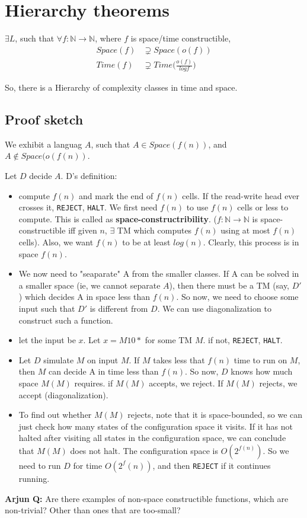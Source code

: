 \section{Hierarchy theorems}
$\exists L$, such that $\forall f: \mathbb{N} \to \mathbb{N}$, where $f$ is
space/time constructible,
\begin{align*}
    Space(f) &\supsetneq Space(o(f)) \\
    Time(f) &\supsetneq Time \bigg (\frac{o(f)}{log f} \bigg )
\end{align*}

So, there is a Hierarchy of complexity classes in time and space.

\subsection{Proof sketch}
We exhibit a languag $A$, such that $A \in Space(f(n))$, and $A \notin Space(o(f(n))$.

Let $D$ decide $A$. D's definition:
\begin{itemize}
    \item compute $f(n)$ and mark the end of $f(n)$ cells. If the read-write head
        ever crosses it, \texttt{REJECT}, \texttt{HALT}. We first need
        $f(n)$ to use $f(n)$ cells or less to compute. This is called as 
        \textbf{space-constructribility}. ($f: \mathbb{N} \to \mathbb{N}$ is
        space-constructible iff given $n$, $\exists$ TM which computes $f(n)$ 
        using at most $f(n)$ cells). Also, we want $f(n)$ to be at least
        $log(n)$. Clearly, this process is in space $f(n)$.

    \item We now need to "seaparate" A from the smaller classes. If A can be
        solved in a smaller space (ie, we cannot separate $A$), then
        there must be a TM (say, $D'$) which decides A in space less than $f(n)$.
        So now, we need to choose some input such that $D'$ is different from $D$.
        We can use diagonalization to construct such a function.

    \item let the input be $x$. Let $x = M10*$ for some TM $M$. if not,
        \texttt{REJECT}, \texttt{HALT}.

    \item Let $D$ simulate $M$ on input $M$. If $M$ takes less that $f(n)$
        time to run on $M$, then $M$ can decide A in time less than $f(n)$.
        So now, $D$ knows how much space $M(M)$ requires. if $M(M)$
        accepts, we reject.  If $M(M)$ rejects, we accept (diagonalization).

    \item To find out whether $M(M)$ rejects, note that it is space-bounded, so
        we can just check how many states of the configuration space it visits.
        If it has not halted after visiting all states in the configuration
        space, we can conclude that $M(M)$ does not halt. The configuration space
        is $O(2^{f(n)})$. So we need to run $D$ for time $O(2^f(n))$, and then
        \texttt{REJECT} if it continues running.
\end{itemize}

\textbf{Arjun Q:} Are there examples of non-space constructible functions, which are non-trivial?
Other than ones that are too-small?
